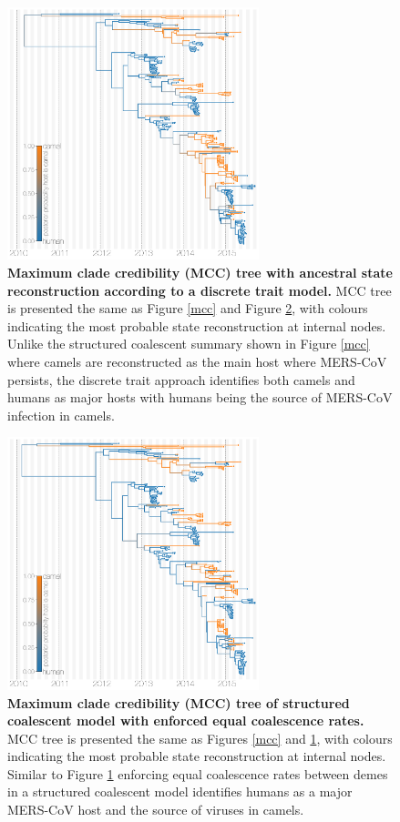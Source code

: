 \documentclass[11pt,oneside,letterpaper]{article}
\begin{document}
\begin{figure}[h]
\centering
	\includegraphics[width=0.65\textwidth]{figures/mers_dta_mcc.png}
	\caption{\textbf{Maximum clade credibility (MCC) tree with ancestral state reconstruction according to a discrete trait model.}
MCC tree is presented the same as Figure \ref{mcc} and Figure \ref{equal_sizes}, with colours indicating the most probable state reconstruction at internal nodes.
Unlike the structured coalescent summary shown in Figure \ref{mcc} where camels are reconstructed as the main host where MERS-CoV persists, the discrete trait approach identifies both camels and humans as major hosts with humans being the source of MERS-CoV infection in camels.
	}
	\label{dta}
\end{figure}

\begin{figure}[h]
\centering
	\includegraphics[width=0.65\textwidth]{figures/mers_es_mcc.png}
	\caption{\textbf{Maximum clade credibility (MCC) tree of structured coalescent model with enforced equal coalescence rates.}
MCC tree is presented the same as Figures \ref{mcc} and \ref{dta}, with colours indicating the most probable state reconstruction at internal nodes.
Similar to Figure \ref{dta} enforcing equal coalescence rates between demes in a structured coalescent model identifies humans as a major MERS-CoV host and the source of viruses in camels.
	}
	\label{equal_sizes}
\end{figure}
\end{document}
